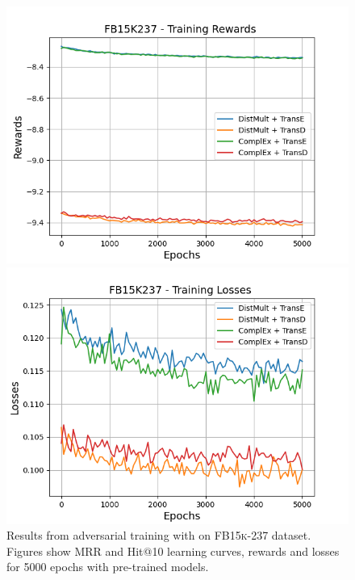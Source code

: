 \begin{figure}
    \begin{minipage}{.45\textwidth}
      \centering
      \includegraphics[width=0.9\linewidth]{figures/results/gan_train/pretrained/uncertainty/max_distribution/entropy/fb15k237/5k_epochs/uncertainty_fb15k237_rew.png}
    \end{minipage}%
     \begin{minipage}{.45\textwidth}
      \centering
      \includegraphics[width=0.9\linewidth]{figures/results/gan_train/pretrained/uncertainty/max_distribution/entropy/fb15k237/5k_epochs/uncertainty_fb15k237_losses.png}
    \end{minipage}%
    \caption{Results from adversarial training with \ussoftmax on \textsc{FB15k-237} dataset.
    Figures show MRR and Hit@10 learning curves, rewards and losses for 5000 epochs with pre-trained models.}
    \label{fig:gan_train_pretrained_ussoftmax_fb15k237}
\end{figure}
